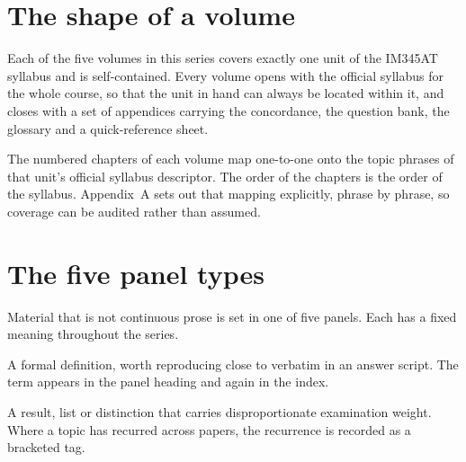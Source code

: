 

\section*{The shape of a volume}

Each of the five volumes in this series covers exactly one unit of the
IM345AT syllabus and is self-contained. Every volume opens with the official
syllabus for the whole course, so that the unit in hand can always be located
within it, and closes with a set of appendices carrying the concordance,
the question bank, the glossary and a quick-reference sheet.

The numbered chapters of each volume map one-to-one onto the topic phrases of
that unit's official syllabus descriptor. The order of the chapters is the
order of the syllabus. Appendix~A sets out that mapping explicitly, phrase by
phrase, so coverage can be audited rather than assumed.

\section*{The five panel types}

Material that is not continuous prose is set in one of five panels. Each has a
fixed meaning throughout the series.

\begin{definitionbox}
A formal definition, worth reproducing close to verbatim in an answer script.
The term appears in the panel heading and again in the index.
\end{definitionbox}

\begin{keybox}
A result, list or distinction that carries disproportionate examination weight.
Where a topic has recurred across papers, the recurrence is recorded as a
bracketed tag. 
\end{keybox}

